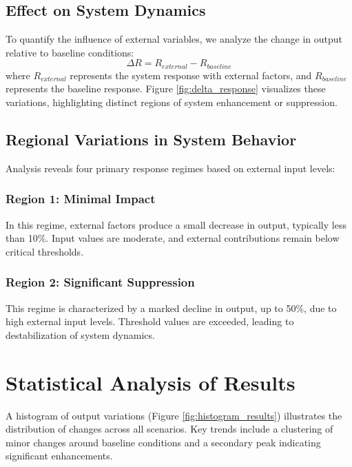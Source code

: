     \subsection{Effect on System Dynamics}
    To quantify the influence of external variables, we analyze the change in output relative to baseline conditions:
    \begin{equation}\label{delta_output}
        \Delta R = R_{external} - R_{baseline}
    \end{equation}
    where $R_{external}$ represents the system response with external factors, and $R_{baseline}$ represents the baseline response. Figure \ref{fig:delta_response} visualizes these variations, highlighting distinct regions of system enhancement or suppression.


    \subsection{Regional Variations in System Behavior}
    Analysis reveals four primary response regimes based on external input levels:
    \subsubsection*{Region 1: Minimal Impact}
    In this regime, external factors produce a small decrease in output, typically less than 10\%. Input values are moderate, and external contributions remain below critical thresholds.

    \subsubsection*{Region 2: Significant Suppression}
    This regime is characterized by a marked decline in output, up to 50\%, due to high external input levels. Threshold values are exceeded, leading to destabilization of system dynamics.



\section{Statistical Analysis of Results}
    A histogram of output variations (Figure \ref{fig:histogram_results}) illustrates the distribution of changes across all scenarios. Key trends include a clustering of minor changes around baseline conditions and a secondary peak indicating significant enhancements.

